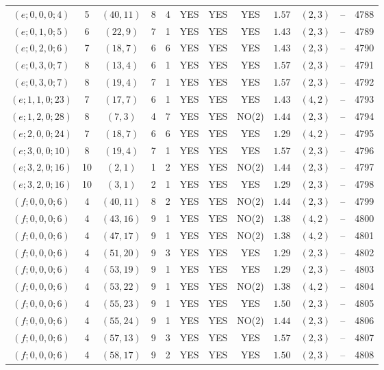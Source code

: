 \begin{longtable}{|c|c|c|c|c|c|c|c|c|c|c|c|}
$(e;0,0,0;4)$ & 5 & $(40,11)$ & 8 & 4 & YES & YES & YES & $1.57$ & $(2,3)$ & -- & 4788\\
$(e;0,1,0;5)$ & 6 & $(22,9)$ & 7 & 1 & YES & YES & YES & $1.43$ & $(2,3)$ & -- & 4789\\
$(e;0,2,0;6)$ & 7 & $(18,7)$ & 6 & 6 & YES & YES & YES & $1.43$ & $(2,3)$ & -- & 4790\\
$(e;0,3,0;7)$ & 8 & $(13,4)$ & 6 & 1 & YES & YES & YES & $1.57$ & $(2,3)$ & -- & 4791\\
$(e;0,3,0;7)$ & 8 & $(19,4)$ & 7 & 1 & YES & YES & YES & $1.57$ & $(2,3)$ & -- & 4792\\
$(e;1,1,0;23)$ & 7 & $(17,7)$ & 6 & 1 & YES & YES & YES & $1.43$ & $(4,2)$ & -- & 4793\\
$(e;1,2,0;28)$ & 8 & $(7,3)$ & 4 & 7 & YES & YES & NO(2) & $1.44$ & $(2,3)$ & -- & 4794\\
$(e;2,0,0;24)$ & 7 & $(18,7)$ & 6 & 6 & YES & YES & YES & $1.29$ & $(4,2)$ & -- & 4795\\
$(e;3,0,0;10)$ & 8 & $(19,4)$ & 7 & 1 & YES & YES & YES & $1.57$ & $(2,3)$ & -- & 4796\\
$(e;3,2,0;16)$ & 10 & $(2,1)$ & 1 & 2 & YES & YES & NO(2) & $1.44$ & $(2,3)$ & -- & 4797\\
$(e;3,2,0;16)$ & 10 & $(3,1)$ & 2 & 1 & YES & YES & YES & $1.29$ & $(2,3)$ & -- & 4798\\
$(f;0,0,0;6)$ & 4 & $(40,11)$ & 8 & 2 & YES & YES & NO(2) & $1.44$ & $(2,3)$ & -- & 4799\\
$(f;0,0,0;6)$ & 4 & $(43,16)$ & 9 & 1 & YES & YES & NO(2) & $1.38$ & $(4,2)$ & -- & 4800\\
$(f;0,0,0;6)$ & 4 & $(47,17)$ & 9 & 1 & YES & YES & NO(2) & $1.38$ & $(4,2)$ & -- & 4801\\
$(f;0,0,0;6)$ & 4 & $(51,20)$ & 9 & 3 & YES & YES & YES & $1.29$ & $(2,3)$ & -- & 4802\\
$(f;0,0,0;6)$ & 4 & $(53,19)$ & 9 & 1 & YES & YES & YES & $1.29$ & $(2,3)$ & -- & 4803\\
$(f;0,0,0;6)$ & 4 & $(53,22)$ & 9 & 1 & YES & YES & NO(2) & $1.38$ & $(4,2)$ & -- & 4804\\
$(f;0,0,0;6)$ & 4 & $(55,23)$ & 9 & 1 & YES & YES & YES & $1.50$ & $(2,3)$ & -- & 4805\\
$(f;0,0,0;6)$ & 4 & $(55,24)$ & 9 & 1 & YES & YES & NO(2) & $1.44$ & $(2,3)$ & -- & 4806\\
$(f;0,0,0;6)$ & 4 & $(57,13)$ & 9 & 3 & YES & YES & YES & $1.57$ & $(2,3)$ & -- & 4807\\
$(f;0,0,0;6)$ & 4 & $(58,17)$ & 9 & 2 & YES & YES & YES & $1.50$ & $(2,3)$ & -- & 4808\\

\end{longtable}
